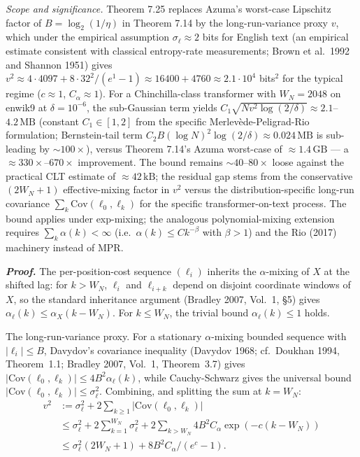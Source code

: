 \documentclass[
]{article}
\begin{document}
\emph{Scope and significance.} Theorem 7.25 replaces Azuma's
worst-case Lipschitz factor of $B = \log_2(1/\eta)$ in Theorem 7.14
by the long-run-variance proxy $v$, which under the empirical
assumption $\sigma_\ell \approx 2$ bits for English text (an
empirical estimate consistent with classical entropy-rate
measurements; Brown et al.\ 1992 and Shannon 1951) gives $v^2 \approx
4 \cdot 4097 + 8 \cdot 32^2 / (e^{1} - 1) \approx 16400 + 4760
\approx 2.1 \cdot 10^4$ bits${}^2$ for the typical regime ($c \approx 1$,
$C_\alpha \approx 1$). For a Chinchilla-class transformer with
$W_N = 2048$ on enwik9 at $\delta = 10^{-6}$, the sub-Gaussian
term yields $C_1 \sqrt{N v^2 \log(2/\delta)} \approx 2.1$--$4.2\,
\mathrm{MB}$ (constant $C_1 \in [1, 2]$ from the specific
Merlev\`ede-Peligrad-Rio formulation; Bernstein-tail term $C_2 B
(\log N)^2 \log(2/\delta) \approx 0.024\,\mathrm{MB}$ is sub-leading
by $\sim 100\times$), versus Theorem 7.14's Azuma worst-case of
$\approx 1.4\,\mathrm{GB}$ --- a $\approx 330\times$--$670\times$
improvement.
The bound remains $\sim 40$--$80\times$ loose against the practical
CLT estimate of $\approx 42\,\mathrm{kB}$; the residual gap stems
from the conservative $(2W_N+1)$ effective-mixing factor in $v^2$
versus the distribution-specific long-run covariance $\sum_k
\mathrm{Cov}(\ell_0, \ell_k)$ for the specific transformer-on-text
process. The bound applies under exp-mixing; the analogous
polynomial-mixing extension requires $\sum_k \alpha(k) < \infty$
(i.e.\ $\alpha(k) \leq C k^{-\beta}$ with $\beta > 1$) and the
Rio (2017) machinery instead of MPR.

\emph{\textbf{Proof.}} The per-position-cost sequence $(\ell_i)$
inherits the $\alpha$-mixing of $X$ at the shifted lag: for $k > W_N$,
$\ell_i$ and $\ell_{i+k}$ depend on disjoint coordinate windows of
$X$, so the standard inheritance argument (Bradley 2007, Vol.~1, §5)
gives $\alpha_{\ell}(k) \leq \alpha_X(k - W_N)$. For $k \leq W_N$,
the trivial bound $\alpha_\ell(k) \leq 1$ holds.

The long-run-variance proxy. For a stationary $\alpha$-mixing
bounded sequence with $|\ell_i| \leq B$, Davydov's covariance
inequality (Davydov 1968; cf.\ Doukhan 1994, Theorem~1.1; Bradley
2007, Vol.~1, Theorem~3.7) gives $|\mathrm{Cov}(\ell_0, \ell_k)|
\leq 4 B^2 \alpha_\ell(k)$, while Cauchy-Schwarz gives the
universal bound $|\mathrm{Cov}(\ell_0, \ell_k)| \leq \sigma_\ell^2$.
Combining, and splitting the sum at $k = W_N$:
\begin{align*}
  v^2 &:= \sigma_\ell^2 + 2 \sum_{k \geq 1} |\mathrm{Cov}(\ell_0, \ell_k)| \\
  &\leq \sigma_\ell^2 + 2 \sum_{k=1}^{W_N} \sigma_\ell^2
  + 2 \sum_{k > W_N} 4 B^2 C_\alpha \exp(-c(k - W_N)) \\
  &\leq \sigma_\ell^2 (2 W_N + 1) + 8 B^2 C_\alpha / (e^c - 1).
\end{align*}
\end{document}
